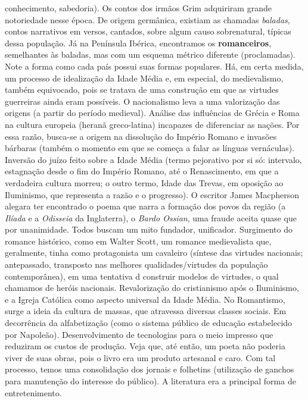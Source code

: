 \begin{enumerate}
conhecimento, sabedoria). Os contos dos irmãos Grim adquiriram grande notoriedade nesse época. De origem germânica, existiam as chamadas \textit{baladas}, contos narrativos em versos, cantados, sobre algum causo sobrenatural, típicas dessa população. Já na Península Ibérica, encontramos os \textbf{romanceiros}, semelhantes às baladas, mas com um esquema métrico diferente (proclamadas). Note a forma como cada país possui suas formas populares. Há, em certa medida, um processo de idealização da Idade Média e, em especial, do medievalismo, também equivocado, pois se tratava de uma construção em que as virtudes guerreiras ainda eram possíveis. O nacionalismo leva a uma valorização das origens (a partir do período medieval). Análise das influências de Grécia e Roma na cultura europeia (heranã greco-latina) incapazes de diferenciar as nações. Por essa razão, busca-se a origem na dissolução do Império Romano e invasões bárbaras (também o momento em que se começa a falar as línguas vernáculas). Inversão do juízo feito sobre a Idade Média (termo pejorativo por si só: intervalo, estagnação desde o fim do Império Romano, até o Renascimento, em que a verdadeira cultura morreu; o outro termo, Idade das Trevas, em oposição ao Iluminismo, que representa a razão e o progresso).
O escritor James Macpherson alegara ter encontrado o poema que narra a formação dos povos da região (a \textit{Ilíada} e a \textit{Odisseia} da Inglaterra), o \textit{Bardo Ossian}, uma fraude aceita quase que por unanimidade. Todos buscam um mito fundador, unificador.
Surgimento do romance histórico, como em Walter Scott, um romance medievalista que, geralmente, tinha como protagonista um cavaleiro (síntese das virtudes nacionais; antepassado, transposto nas melhores qualidades/virtudes da população contemporânea), em uma tentativa d construir modelos de virtudes, o qual chamamos de heróis nacionais.
Revalorização do cristianismo após o Iluminismo, e a Igreja Católica como aspecto universal da Idade Média.
No Romantismo, surge a ideia da cultura de massas, que atravessa diversas classes sociais. Em decorrência da alfabetização (como o sistema público de educação estabelecido por Napoleão). Desenvolvimento de tecnologias para o meio impresso que reduziram os custos de produção. Veja que, até então, um poeta não poderia viver de suas obras, pois o livro era um produto artesanal e caro. Com tal processo, temos uma consolidação dos jornais e folhetins (utilização de ganchos para manutenção do interesse do público). A literatura era a principal forma de entretenimento.

\end{enumerate}
